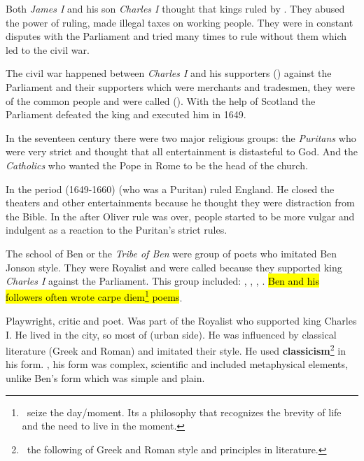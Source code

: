 

Both \textit{James I} and his son \textit{Charles I} thought that kings ruled 
by . They abused the power of ruling, made illegal taxes
on working people. They were in constant disputes with the Parliament and tried 
many times to rule without them which led to the civil war.


The civil war happened between \textit{Charles I} and his supporters 
() against the Parliament and their supporters which were
merchants and tradesmen, they were of the common people and were called (). 
With the help of Scotland the Parliament defeated the king and executed him in 1649.


In the seventeen century there were two major religious groups: the
\textit{Puritans} who were very strict and thought that all entertainment is
distasteful to God. And the \textit{Catholics} who wanted the Pope in Rome to 
be the head of the church.\medbreak

In the period (1649-1660)  (who was a Puritan) ruled England. He closed the 
theaters and other entertainments because he thought they were distraction
from the Bible. In the  after Oliver rule was over, 
people started to be more vulgar and indulgent as a reaction to the Puritan's strict rules.


The school of Ben or the \textit{Tribe of Ben} were group of poets who imitated
Ben Jonson style. They were Royalist and were called  because they
supported king \textit{Charles I} against the Parliament. This group included: 
, , 
, . \hl{Ben and his followers often wrote 
carpe diem\footnote{\, seize the day/moment. Its a philosophy that recognizes the brevity of life
and the need to live in the moment.} poems}.\medbreak


Playwright, critic and poet. Was part of the Royalist who supported 
king Charles I. He lived in the city, 
so most of  (urban side). He was influenced by classical 
literature (Greek and Roman) and imitated their style. He used
\textbf{classicism}\footnote{\, the following of Greek and Roman style and 
principles in literature.} 
in his form. , his 
form was complex, scientific and included metaphysical elements, unlike
Ben's form which was simple and plain.


